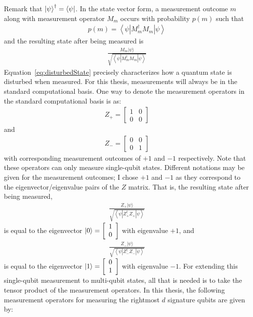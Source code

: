 Remark that $\ket{\psi}^{\dagger} = \bra{\psi}$. In the state vector form, a measurement outcome $m$ along with measurement operator $M_m$ occurs with probability $p(m)$ such that
\begin{align}
p(m)=\left\langle\psi\left|M_{m}^{\dagger} M_{m}\right| \psi\right\rangle
\end{align}
and the resulting state after being measured is
\begin{align}
\frac{M_{m}|\psi\rangle}{\sqrt{\left\langle\psi\left|M_{m}^{\dagger} M_{m}\right| \psi\right\rangle}} \label{eq:disturbedState}
\end{align}
Equation~\eqref{eq:disturbedState} precisely characterizes how a quantum state is disturbed when measured. For this thesis, measurements will always be in the standard computational basis. One way to denote the measurement operators in the standard computational basis is as:
\begin{align}
Z_+ = \left[\begin{array}{ll}
1 & 0 \\
0 & 0
\end{array}\right]
\end{align}
and
\begin{align}
Z_- = \left[\begin{array}{ll}
0 & 0 \\
0 & 1
\end{array}\right]
\end{align}
with corresponding measurement outcomes of $+1$ and $-1$ respectively. Note that these operators can only measure single-qubit states. Different notations may be given for the measurement outcomes; I chose $+1$ and $-1$ as they correspond to the eigenvector/eigenvalue pairs of the $Z$ matrix. That is, the resulting state after being measured,
\begin{align}
\frac{Z_+|\psi\rangle}{\sqrt{\left\langle\psi\left|Z_+^{\dagger} Z_+\right| \psi\right\rangle}}
\end{align}
is equal to the eigenvector $\ket{0} = \left[\begin{array}{ll}
1\\
0
\end{array}\right]$ with eigenvalue $+1$, and
\begin{align}
\frac{Z_-|\psi\rangle}{\sqrt{\left\langle\psi\left|Z_-^{\dagger} Z_-\right| \psi\right\rangle}}
\end{align}
is equal to the eigenvector $\ket{1} = \left[\begin{array}{ll}
0\\
1
\end{array}\right]$ with eigenvalue $-1$. For extending this single-qubit measurement to multi-qubit states, all that is needed is to take the tensor product of the measurement operators. In this thesis, the following measurement operators for measuring the rightmost $d$ signature qubits are given by:
